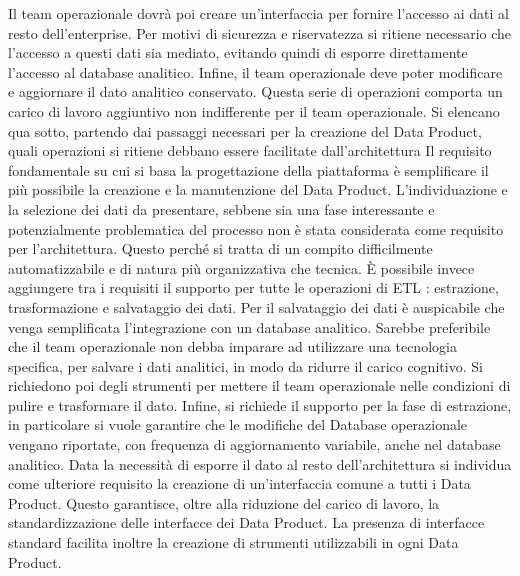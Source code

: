 \documentclass[12pt]{report}
\begin{document}
Il team operazionale dovrà poi creare un'interfaccia per fornire l'accesso ai dati al resto dell'enterprise.
Per motivi di sicurezza e riservatezza si ritiene necessario che l'accesso a questi dati sia mediato, evitando quindi di esporre direttamente l'accesso al database analitico.
Infine, il team operazionale deve poter modificare e aggiornare il dato analitico conservato.
Questa serie di operazioni comporta un carico di lavoro aggiuntivo non indifferente per il team operazionale. 
Si elencano qua sotto, partendo dai passaggi necessari per la creazione del Data Product, quali operazioni si ritiene debbano essere facilitate dall'architettura
Il requisito fondamentale su cui si basa la progettazione della piattaforma è semplificare il più possibile la creazione e la manutenzione del Data Product.
L'individuazione e la selezione dei dati da presentare, sebbene sia una fase interessante e potenzialmente problematica del processo non è stata considerata come requisito per l'architettura. 
Questo perché si tratta di un compito difficilmente automatizzabile e di natura più organizzativa che tecnica.
È possibile invece aggiungere tra i requisiti il supporto per tutte le operazioni di ETL : estrazione, trasformazione e salvataggio dei dati.
Per il salvataggio dei dati è auspicabile che venga semplificata l'integrazione con un database analitico. 
Sarebbe preferibile che il team operazionale non debba imparare ad utilizzare una tecnologia specifica, per salvare i dati analitici, in modo da ridurre il carico cognitivo.
Si richiedono poi degli strumenti per mettere il team operazionale nelle condizioni di pulire e trasformare il dato.
Infine, si richiede il supporto per la fase di estrazione, in particolare si vuole garantire che le modifiche del Database operazionale vengano riportate, con frequenza di aggiornamento variabile, anche nel database analitico.
Data la necessità di esporre il dato al resto dell'architettura si individua come ulteriore requisito la creazione di un'interfaccia comune a tutti i Data Product.
Questo garantisce, oltre alla riduzione del carico di lavoro, la standardizzazione delle interfacce dei Data Product.
La presenza di interfacce standard facilita inoltre la creazione di strumenti utilizzabili in ogni Data Product.
\end{document}
